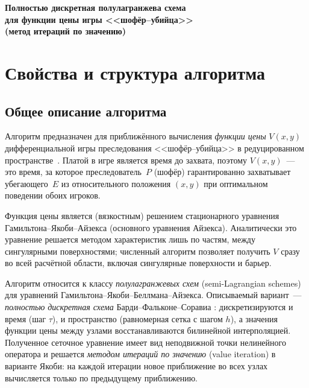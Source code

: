 \documentclass[14pt,a4paper]{extarticle}
\begin{document}
\begin{center}
	{\bfseries\large Полностью дискретная полулагранжева схема\\
	для функции цены игры <<шофёр--убийца>>\\
	(метод итераций по значению)}
\end{center}

\vspace{0.5cm}

\tableofcontents
\newpage

\section{Свойства и структура алгоритма}

\subsection{Общее описание алгоритма}

Алгоритм предназначен для приближённого вычисления \emph{функции цены}
$V(x,y)$ дифференциальной игры преследования <<шофёр--убийца>>
в редуцированном пространстве~\cite{isaacs}. Платой в игре является время до захвата,
поэтому $V(x,y)$~--- это время, за которое преследователь~$P$ (шофёр)
гарантированно захватывает убегающего~$E$ из относительного положения
$(x,y)$ при оптимальном поведении обоих игроков.

Функция цены является (вязкостным) решением стационарного уравнения
Гамильтона--Якоби--Айзекса (основного уравнения Айзекса). Аналитически
это уравнение решается методом характеристик лишь по частям, между
сингулярными поверхностями; численный алгоритм позволяет получить $V$
сразу во всей расчётной области, включая сингулярные поверхности и
барьер.

Алгоритм относится к классу \emph{полулагранжевых схем} (semi-Lagrangian
schemes) для уравнений Гамильтона--Якоби--Беллмана--Айзекса. Описываемый
вариант~--- \emph{полностью дискретная схема} Барди--Фальконе--Соравиа
\cite{bfs,ff}: дискретизируются и время (шаг $\tau$), и пространство
(равномерная сетка с шагом $h$), а значения функции цены между узлами
восстанавливаются билинейной интерполяцией. Полученное сеточное
уравнение имеет вид неподвижной точки нелинейного оператора и решается
\emph{методом итераций по значению} (value iteration) в варианте Якоби:
на каждой итерации новое приближение во всех узлах вычисляется только по
предыдущему приближению.
\end{document}
